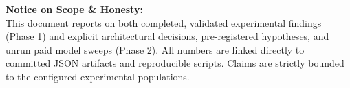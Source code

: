 \documentclass[10pt,letterpaper]{article}
\begin{document}
\begin{titlepage}
\begin{center}
\vfill

\begin{minipage}{0.9\textwidth}
\centering\footnotesize\textcolor{secondary}{\textsf{
\textbf{Notice on Scope \& Honesty:}\\
This document reports on both completed, validated experimental findings (Phase 1) and explicit architectural decisions, pre-registered hypotheses, and unrun paid model sweeps (Phase 2). All numbers are linked directly to committed JSON artifacts and reproducible scripts. Claims are strictly bounded to the configured experimental populations.
}}
\end{minipage}

\vspace*{0.5cm}
\end{center}
\end{titlepage}

\newpage
\setcounter{tocdepth}{1}
\tableofcontents
\newpage















\end{document}
